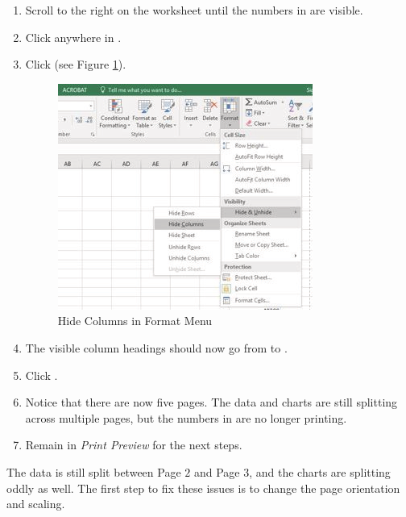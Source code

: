 \begin{enumbox}
	\begin{enumerate}
		\item Scroll to the right on the worksheet until the numbers in  are visible.
		\item Click anywhere in .
		\item Click  (see Figure \ref{04:fig52}).
		
		\begin{figure}[H]
			\centering
			\includegraphics[width=\maxwidth{.95\linewidth}]{gfx/ch04_fig52}
			\caption{Hide Columns in Format Menu}
			\label{04:fig52}
		\end{figure}
			
		\item The visible column headings should now go from  to .
		\item Click .
		\item Notice that there are now five pages. The data and charts are still splitting across multiple pages, but the numbers in  are no longer printing.
		\item Remain in \textit{Print Preview} for the next steps.
	\end{enumerate}
\end{enumbox}

The data is still split between Page $ 2 $ and Page $ 3 $, and the charts are splitting oddly as well. The first step to fix these issues is to change the page orientation and scaling.

